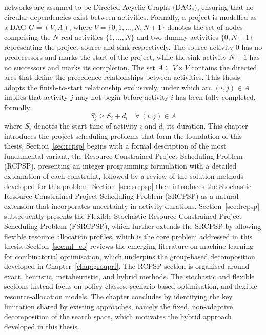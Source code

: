 networks are assumed to be Directed Acyclic Graphs (DAGs), ensuring that no circular
dependencies exist between activities. Formally, a project is modelled as a DAG
\(G = (V, A)\), where \(V = \{0, 1, \ldots, N, N+1\}\) denotes the set of nodes
comprising the \(N\) real activities \(\{1, \ldots, N\}\) and two dummy activities
\(\{0, N+1\}\) representing the project source and sink respectively. The source
activity \(0\) has no predecessors and marks the start of the project, while the sink
activity \(N+1\) has no successors and marks its completion. The set
\(A \subseteq V \times V\) contains the directed arcs that define the precedence
relationships between activities. This thesis adopts the finish-to-start relationship
exclusively, under which arc \((i, j) \in A\) implies that activity \(j\) may not begin
before activity \(i\) has been fully completed, formally:
\[
  S_j \geq S_i + d_i \quad \forall\, (i, j) \in A
\]
where \(S_i\) denotes the start time of activity \(i\) and \(d_i\) its duration.
This chapter introduces the project scheduling problems that form the foundation of this
thesis. Section~\ref{sec:rcpsp} begins with a formal description of the most fundamental
variant, the Resource-Constrained Project Scheduling Problem (RCPSP), presenting an
integer programming formulation with a detailed explanation of each constraint, followed
by a review of the solution methods developed for this problem.
Section~\ref{sec:srcpsp} then introduces the Stochastic Resource-Constrained Project
Scheduling Problem (SRCPSP) as a natural extension that incorporates uncertainty in
activity durations. Section~\ref{sec:frcpsp} subsequently presents the Flexible
Stochastic Resource-Constrained Project Scheduling Problem (FSRCPSP), which further
extends the SRCPSP by allowing flexible resource allocation profiles, which is the core problem
addressed in this thesis. Section~\ref{sec:ml_co} reviews the emerging literature on
machine learning for combinatorial optimisation, which underpins the group-based
decomposition developed in Chapter~\ref{chap:grouprf}. The RCPSP section is organised around exact, heuristic, metaheuristic, and hybrid methods. The stochastic and flexible sections instead focus on policy classes,
scenario-based optimisation, and flexible resource-allocation models. The chapter
concludes by identifying the key limitation shared by existing approaches, namely the fixed,
non-adaptive decomposition of the search space, which motivates the hybrid approach
developed in this thesis.

